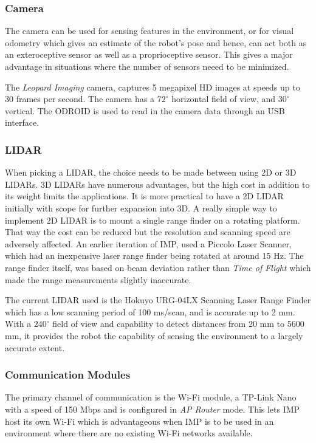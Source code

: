 \subsubsection{Camera}

The camera can be used for sensing features in the environment, or for visual odometry which gives an estimate of the robot's pose and hence, can act both as an exteroceptive sensor as well as a proprioceptive sensor. This gives a major advantage in situations where the number of sensors neeed to be minimized.

The \textit{Leopard Imaging} camera, captures 5 megapixel HD images at speeds up to 30 frames per second. The camera has a $ 72^\circ $ horizontal field of view, and $ 30^\circ $ vertical. The ODROID is used to read in the camera data through an USB interface.

\subsubsection{LIDAR}
When picking a LIDAR, the choice needs to be made between using 2D or 3D LIDARs. 3D LIDARs have numerous advantages, but the high cost in addition to its weight limits the applications. It is more practical to have a 2D LIDAR initially with scope for further expansion into 3D. A really simple way to implement 2D LIDAR is to mount a single range finder on a rotating platform. That way the cost can be reduced but the resolution and scanning speed are adversely affected. An earlier iteration of IMP, used a Piccolo Laser Scanner, which had an inexpensive laser range finder being rotated at around 15 Hz. The range finder itself, was based on beam deviation rather than \textit{Time of Flight} which made the range measurements slightly inaccurate.

The current LIDAR used is the Hokuyo URG-04LX Scanning Laser Range Finder which has a low scanning period of 100 ms/scan, and is accurate up to 2 mm. With a $ 240^\circ $ field of view and capability to detect distances from 20 mm to 5600 mm, it provides the robot the capability of sensing the environment to a largely accurate extent.

\subsubsection{Communication Modules}
The primary channel of communication is the Wi-Fi module, a TP-Link Nano with a speed of 150 Mbps and is configured in \textit{AP Router} mode. This lets IMP host its own Wi-Fi which is advantageous when IMP is to be used in an environment where there are no existing Wi-Fi networks available. 

